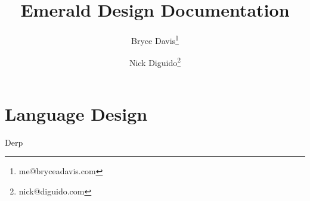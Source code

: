 \documentclass{article}
\title{Emerald Design Documentation}
\author[1]{Bryce Davis\thanks{me@bryceadavis.com}}
\author[1]{Nick Diguido\thanks{nick@diguido.com}}
\affil[1]{Datum Unlimited}
\begin{document}
    \maketitle

    \pagebreak

    \part{Language Design}
    Derp
\end{document}
